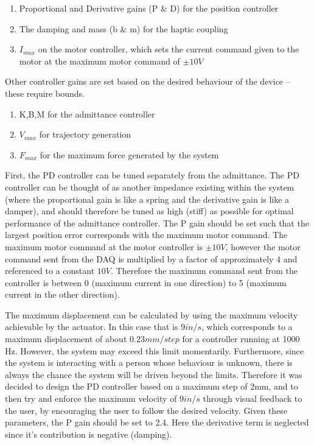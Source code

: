 \documentclass[12pt]{report}
\begin{document}
	\begin{enumerate}
		\item Proportional and Derivative gains (P \& D) for the position controller 
		\item The damping and mass (b \& m) for the haptic coupling 
		\item $I_{max}$ on the motor controller, which sets the current command given to the motor at the maximum motor command of $\pm 10V$
	\end{enumerate}		
	
	Other controller gains are set based on the desired behaviour of the device -- these require bounds. 
	
	\begin{enumerate}
		\item K,B,M for the admittance controller
		\item $V_{max}$ for trajectory generation
		\item $F_{max}$ for the maximum force generated by the system
	\end{enumerate}
	
	
	First, the PD controller can be tuned separately from the admittance. The PD controller can be thought of as another impedance existing within the system (where the proportional gain is like a spring and the derivative gain is like a damper), and should therefore be tuned as high (stiff) as possible for optimal performance of the admittance controller. The P gain should be set such that the largest position error corresponds with the maximum motor command. The maximum motor command at the motor controller is $\pm 10V$, however the motor command sent from the DAQ is multiplied by a factor of approximately 4 and referenced to a constant $10 V$. Therefore the maximum command sent from the controller is between 0 (maximum current in one direction) to 5 (maximum current in the other direction). 
	
	The maximum displacement can be calculated by using the maximum velocity achievable by the actuator. In this case that is $9 in/s$, which corresponds to a maximum displacement of about $0.23 mm/step$ for a controller running at 1000 Hz. However, the system may exceed this limit momentarily. Furthermore, since the system is interacting with a person whose behaviour is unknown, there is always the chance the system will be driven beyond the limits. Therefore it was decided to design the PD controller based on a maximum step of 2mm, and to then try and enforce the maximum velocity of $9 in/s$ through visual feedback to the user, by encouraging the user to follow the desired velocity. Given these parameters, the P gain should be set to 2.4. Here the derivative term is neglected since it's contribution is negative (damping). 
	
\end{document}
